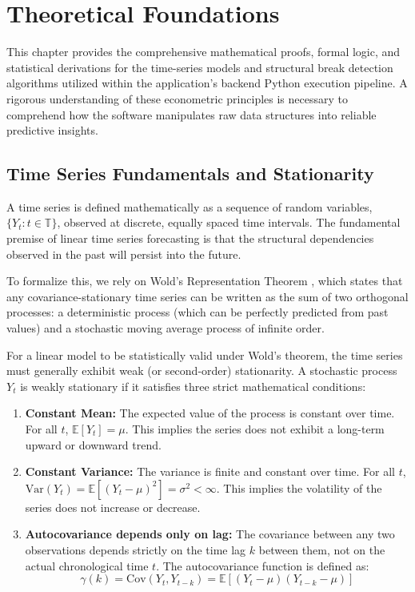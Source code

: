\documentclass[11pt, a4paper]{report}
\begin{document}
\chapter{Theoretical Foundations}
\label{ch:theoretical_foundations}

This chapter provides the comprehensive mathematical proofs, formal logic, and statistical derivations for the time-series models and structural break detection algorithms utilized within the application's backend Python execution pipeline. A rigorous understanding of these econometric principles is necessary to comprehend how the software manipulates raw data structures into reliable predictive insights.

\section{Time Series Fundamentals and Stationarity}
A time series is defined mathematically as a sequence of random variables, $\{Y_t : t \in \mathbb{T}\}$, observed at discrete, equally spaced time intervals. The fundamental premise of linear time series forecasting is that the structural dependencies observed in the past will persist into the future. 

To formalize this, we rely on Wold's Representation Theorem \cite{Wold1938}, which states that any covariance-stationary time series can be written as the sum of two orthogonal processes: a deterministic process (which can be perfectly predicted from past values) and a stochastic moving average process of infinite order.

For a linear model to be statistically valid under Wold's theorem, the time series must generally exhibit weak (or second-order) stationarity. A stochastic process $Y_t$ is weakly stationary if it satisfies three strict mathematical conditions:
\begin{enumerate}
    \item \textbf{Constant Mean:} The expected value of the process is constant over time. For all $t$, $\mathbb{E}[Y_t] = \mu$. This implies the series does not exhibit a long-term upward or downward trend.
    \item \textbf{Constant Variance:} The variance is finite and constant over time. For all $t$, $\text{Var}(Y_t) = \mathbb{E}[(Y_t - \mu)^2] = \sigma^2 < \infty$. This implies the volatility of the series does not increase or decrease.
    \item \textbf{Autocovariance depends only on lag:} The covariance between any two observations depends strictly on the time lag $k$ between them, not on the actual chronological time $t$. The autocovariance function is defined as:
    \begin{equation}
        \gamma(k) = \text{Cov}(Y_t, Y_{t-k}) = \mathbb{E}[(Y_t - \mu)(Y_{t-k} - \mu)]
    \end{equation}
\end{enumerate}
\end{document}
